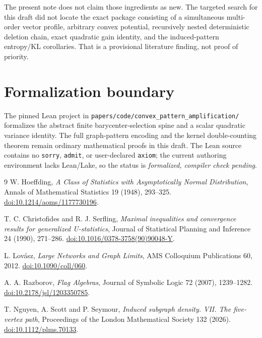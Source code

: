 \documentclass[11pt]{article}
\begin{document}
The present note does not claim those ingredients as new. The targeted search for this draft did not locate the exact package consisting of a simultaneous multi-order vector profile, arbitrary convex potential, recursively nested deterministic deletion chain, exact quadratic gain identity, and the induced-pattern entropy/KL corollaries. That is a provisional literature finding, not proof of priority.

\section{Formalization boundary}
The pinned Lean project in \texttt{papers/code/convex\_pattern\_amplification/} formalizes the abstract finite barycenter-selection spine and a scalar quadratic variance identity. The full graph-pattern encoding and the kernel double-counting theorem remain ordinary mathematical proofs in this draft. The Lean source contains no \texttt{sorry}, \texttt{admit}, or user-declared \texttt{axiom}; the current authoring environment lacks Lean/Lake, so the status is \emph{formalized, compiler check pending}.

\begin{thebibliography}{9}
W. Hoeffding,
\emph{A Class of Statistics with Asymptotically Normal Distribution},
Annals of Mathematical Statistics 19 (1948), 293--325.
\href{https://doi.org/10.1214/aoms/1177730196}{doi:10.1214/aoms/1177730196}.

T. C. Christofides and R. J. Serfling,
\emph{Maximal inequalities and convergence results for generalized U-statistics},
Journal of Statistical Planning and Inference 24 (1990), 271--286.
\href{https://doi.org/10.1016/0378-3758(90)90048-Y}{doi:10.1016/0378-3758(90)90048-Y}.

L. Lov\'asz,
\emph{Large Networks and Graph Limits},
AMS Colloquium Publications 60, 2012.
\href{https://doi.org/10.1090/coll/060}{doi:10.1090/coll/060}.

A. A. Razborov,
\emph{Flag Algebras},
Journal of Symbolic Logic 72 (2007), 1239--1282.
\href{https://doi.org/10.2178/jsl/1203350785}{doi:10.2178/jsl/1203350785}.

T. Nguyen, A. Scott and P. Seymour,
\emph{Induced subgraph density. VII. The five-vertex path},
Proceedings of the London Mathematical Society 132 (2026).
\href{https://doi.org/10.1112/plms.70133}{doi:10.1112/plms.70133}.
\end{thebibliography}
\end{document}
